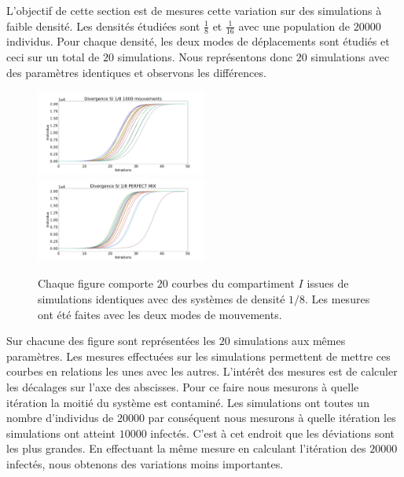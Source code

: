 L'objectif de cette section est de mesures cette variation sur des simulations à faible densité. Les densités étudiées sont $\frac{1}{8}$ et $\frac{1}{16}$ avec une population de $20000$ individus. Pour chaque densité, les deux modes de déplacements sont étudiés et ceci sur un total de $20$ simulations. Nous représentons donc $20$ simulations avec des paramètres identiques et observons les différences.

\newpage

\begin{figure}
    \centering
    \captionsetup{justification=centering}
    \includegraphics[width=0.5\textwidth]{Images/SI_divergence_8_1000.pdf}
    \includegraphics[width=0.5\textwidth]{Images/SI_divergence_8_mix.pdf}
    \caption[Variations aléatoires : SI]{Chaque figure comporte $20$ courbes du compartiment $I$ issues de simulations identiques avec des systèmes de densité $1/8$. Les mesures ont été faites avec les deux modes de mouvements.}
\end{figure}

Sur chacune des figure sont représentées les $20$ simulations aux mêmes paramètres. Les mesures effectuées sur les simulations permettent de mettre ces courbes en relations les unes avec les autres. L'intérêt des mesures est de calculer les décalages sur l'axe des abscisses. Pour ce faire nous mesurons à quelle itération la moitié du système est contaminé. Les simulations ont toutes un nombre d'individus de $20000$ par conséquent nous mesurons à quelle itération les simulations ont atteint $10000$ infectés. C'est à cet endroit que les déviations sont les plus grandes. En effectuant la même mesure en calculant l'itération des $20000$ infectés, nous obtenons des variations moins importantes.\\

